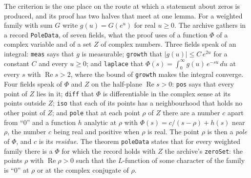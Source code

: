 \documentclass[11pt]{article}
\theoremstyle{definition}
\theoremstyle{remark}
\newcommand{\re}{\operatorname{Re}}
\DeclareRobustCommand{\lean}[1]{{\renewcommand{\_}{\textunderscore\allowbreak}\texttt{#1}}}
\begin{document}
The criterion is the one place on the route at which a statement about zeros is produced, and its proof has two halves that meet at one lemma. For a weighted family with sum $G$ write $g(u)=G(e^{u})$ for real $u\ge0$. The archive gathers in a record \lean{PoleData}, of seven fields, what the proof uses of a function $\Phi$ of a complex variable and of a set $Z$ of complex numbers. Three fields speak of an integral: \lean{meas} says that $g$ is measurable; \lean{growth} that $|g(u)|\le C\,e^{2u}$ for a constant $C$ and every $u\ge0$; and \lean{laplace} that $\Phi(s)=\int_0^\infty g(u)\,e^{-su}\,du$ at every $s$ with $\re s>2$, where the bound of \lean{growth} makes the integral converge. Four fields speak of $\Phi$ and $Z$ on the half-plane $\re s>0$: \lean{pos} says that every point of $Z$ lies in it; \lean{diff} that $\Phi$ is differentiable in the complex sense at its points outside $Z$; \lean{iso} that each of its points has a neighbourhood that holds no other point of $Z$; and \lean{pole} that at each point $\rho$ of $Z$ there are a number $c$ apart from ``0'' and a function $h$ analytic at $\rho$ with $\Phi(s)=c/(s-\rho)+h(s)$ near $\rho$, the number $c$ being real and positive when $\rho$ is real. The point $\rho$ is then a \emph{pole} of $\Phi$, and $c$ is its \emph{residue}. The theorem \lean{poleData} states that for every weighted family there is a $\Phi$ for which the record holds with $Z$ the archive's \lean{zeroSet}: the points $\rho$ with $\re\rho>0$ such that the $L$-function of some character of the family is ``0'' at $\rho$ or at the complex conjugate of $\rho$.
\end{document}
